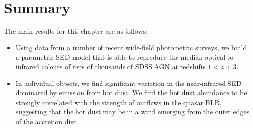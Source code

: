 \section{Summary}

The main results for this chapter are as follows:

\begin{itemize}

\item Using data from a number of recent wide-field photometric surveys, we build a parametric SED model that is able to reproduce the median optical to infrared colours of tens of thousands of SDSS AGN at redshifts $1 < z < 3$. 

\item In individual objects, we find significant variation in the near-infrared SED dominated by emission from hot dust. We find the hot dust abundance to be strongly correlated with the strength of outflows in the quasar BLR, suggesting that the hot dust may be in a wind emerging from the outer edges of the accretion disc. 



\end{itemize}